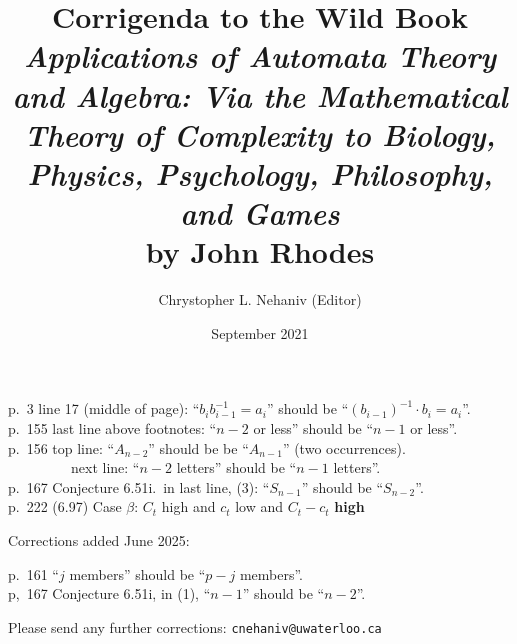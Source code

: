 \documentclass{article}
\title{Corrigenda to the Wild Book\\[1em]
{\em Applications of Automata Theory and Algebra: Via the Mathematical Theory of Complexity to Biology, Physics, Psychology, Philosophy, and Games} \\[1em] by John Rhodes}
\author{Chrystopher L. Nehaniv (Editor)}
\date{September 2021}
\begin{document}
\maketitle



p.\ 3 line 17 (middle of page):   ``$b_i b_{i-1}^{-1}=a_i$'' should be ``$(b_{i-1})^{-1} \cdot b_i=a_i$''. \\

p.\ 155 last line above footnotes:   ``$n-2$ or less'' should be ``$n-1$ or less''.\\

p.\ 156 top line: ``$A_{n-2}$'' should be be ``$A_{n-1}$'' (two occurrences).\\

\ \ \ \ \ \ \ \ \  next line:  ``$n-2$ letters'' should be ``$n-1$ letters''.\\
 
p.\ 167 Conjecture 6.51i.\ in last line,  (3):   ``$S_{n-1}$'' should be ``$S_{n-2}$''.  \\


p.\ 222 (6.97) Case $\beta$:  $C_t$ high and $c_t$ low and $C_t-c_t$ {\bf high}

\vspace{1cm}
Corrections added June 2025:\\
\vspace{1em}


p.\ 161 ``$j$ members'' should be ``$p-j$ members''.\\

p,\ 167 Conjecture 6.51i, in (1), ``$n-1$'' should be ``$n-2$''.

\vfill
Please send any further corrections:  {\tt cnehaniv@uwaterloo.ca}
\end{document}

